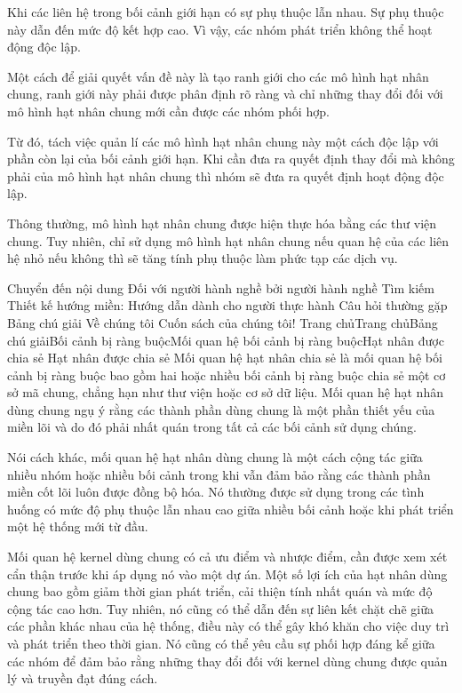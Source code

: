 
Khi các liên hệ trong bối cảnh giới hạn có sự phụ thuộc lẫn nhau. Sự phụ thuộc này dẫn đến mức độ kết hợp cao. Vì vậy, các nhóm phát triển không thể hoạt động độc lập.

Một cách để giải quyết vấn đề này là tạo ranh giới cho các mô hình hạt nhân chung, ranh giới này phải được phân định rõ ràng và chỉ những thay đổi đối với mô hình hạt nhân chung mới cần được các nhóm phối hợp.

Từ đó, tách việc quản lí các mô hình hạt nhân chung này một cách độc lập với phần còn lại của bối cảnh giới hạn. Khi cần đưa ra quyết định thay đổi mà không phải của mô hình hạt nhân chung thì nhóm sẽ đưa ra quyết định hoạt động độc lập.

Thông thường, mô hình hạt nhân chung được hiện thực hóa bằng các thư viện chung. Tuy nhiên, chỉ sử dụng mô hình hạt nhân chung nếu quan hệ của các liên hệ nhỏ nếu không thì sẽ tăng tính phụ thuộc làm phức tạp các dịch vụ.


Chuyển đến nội dung
Đối với người hành nghề bởi người hành nghề
Tìm kiếm
Thiết kế hướng miền: Hướng dẫn dành cho người thực hành
Câu hỏi thường gặp
Bảng chú giải
Về chúng tôi
Cuốn sách của chúng tôi!
Trang chủTrang chủBảng chú giảiBối cảnh bị ràng buộcMối quan hệ bối cảnh bị ràng buộcHạt nhân được chia sẻ
Hạt nhân được chia sẻ
Mối quan hệ hạt nhân chia sẻ là mối quan hệ bối cảnh bị ràng buộc bao gồm hai hoặc nhiều bối cảnh bị ràng buộc chia sẻ một cơ sở mã chung, chẳng hạn như thư viện hoặc cơ sở dữ liệu. Mối quan hệ hạt nhân dùng chung ngụ ý rằng các thành phần dùng chung là một phần thiết yếu của miền lõi và do đó phải nhất quán trong tất cả các bối cảnh sử dụng chúng.

Nói cách khác, mối quan hệ hạt nhân dùng chung là một cách cộng tác giữa nhiều nhóm hoặc nhiều bối cảnh trong khi vẫn đảm bảo rằng các thành phần miền cốt lõi luôn được đồng bộ hóa. Nó thường được sử dụng trong các tình huống có mức độ phụ thuộc lẫn nhau cao giữa nhiều bối cảnh hoặc khi phát triển một hệ thống mới từ đầu.

Mối quan hệ kernel dùng chung có cả ưu điểm và nhược điểm, cần được xem xét cẩn thận trước khi áp dụng nó vào một dự án. Một số lợi ích của hạt nhân dùng chung bao gồm giảm thời gian phát triển, cải thiện tính nhất quán và mức độ cộng tác cao hơn. Tuy nhiên, nó cũng có thể dẫn đến sự liên kết chặt chẽ giữa các phần khác nhau của hệ thống, điều này có thể gây khó khăn cho việc duy trì và phát triển theo thời gian. Nó cũng có thể yêu cầu sự phối hợp đáng kể giữa các nhóm để đảm bảo rằng những thay đổi đối với kernel dùng chung được quản lý và truyền đạt đúng cách.

